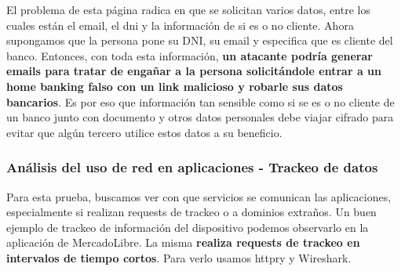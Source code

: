 El problema de esta página radica en que se solicitan varios datos, entre los cuales están el email, el dni y la información de si es o 
no cliente. Ahora supongamos que la persona pone su DNI, su email y especifica que es cliente del banco. Entonces, con toda esta información, 
\textbf{un atacante podría generar emails para tratar de engañar a la persona solicitándole entrar a un home banking falso con un link 
malicioso y robarle sus datos bancarios}. Es por eso que información tan sensible como si se es o no cliente de un banco junto con documento 
y otros datos personales debe viajar cifrado para evitar que algún tercero utilice estos datos a su beneficio.


\subsubsection{Análisis del uso de red en aplicaciones - Trackeo de datos}

Para esta prueba, buscamos ver con que servicios se comunican las aplicaciones, especialmente si realizan requests de trackeo o a 
dominios extraños. Un buen ejemplo de trackeo de información del dispositivo podemos observarlo en la aplicación de MercadoLibre. La 
misma \textbf{realiza requests de trackeo en intervalos de tiempo cortos}. Para verlo usamos httpry y Wireshark.

